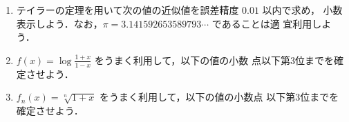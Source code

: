 \documentclass[11pt, uplatex, dvipdfmx, twoside]{jsarticle}
\newcommand{\ds}{\displaystyle}
\begin{document}
\begin{enumerate}[label=\arabic{section}.\arabic*]

  \setlength{\itemsep}{1zh}
  
\item テイラーの定理を用いて次の値の近似値を誤差精度 $0.01$ 以内で求め，
  小数表示しよう．なお，$\pi = 3.141592653589793\cdots$ であることは適
  宜利用しよう．

  \vspace{1ex}


\item $\ds f(x) = \log\frac{1+x}{1-x}$ をうまく利用して，以下の値の小数
  点以下第3位までを確定させよう．

  \vspace{1ex}


\item $f_n(x) = \sqrt[n]{1+x}$ をうまく利用して，以下の値の小数点
  以下第3位までを確定させよう．

  \vspace{1ex}

\end{enumerate}
\end{document}
